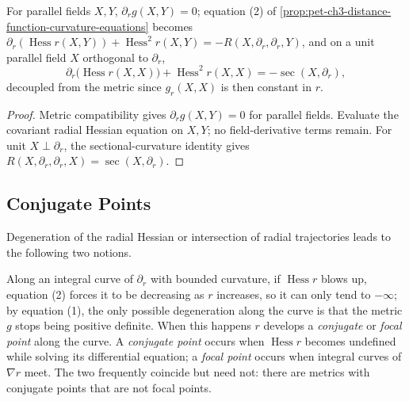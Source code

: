 \begin{proposition}
  \label{prop:pet-ch3-parallel-field-curvature-equation}


  For parallel fields $X,Y$, $\partial_rg(X,Y)=0$; equation (2) of
  \cref{prop:pet-ch3-distance-function-curvature-equations} becomes
  $\partial_r(\operatorname{Hess}r(X,Y))+\operatorname{Hess}^2r(X,Y)=-R(X,\partial_r,\partial_r,Y)$,
  and on a unit parallel field $X$ orthogonal to $\partial_r$,
  \[
    \partial_r\big(\operatorname{Hess}r(X,X)\big)+\operatorname{Hess}^2r(X,X)=-\sec(X,\partial_r),
  \]
  decoupled from the metric since $g_r(X,X)$ is then constant in $r$.
\end{proposition}
\begin{proof}

  \sketch
  Metric compatibility gives $\partial_rg(X,Y)=0$ for parallel fields. Evaluate
  the covariant radial Hessian equation on $X,Y$; no field-derivative terms remain.
  For unit $X\perp\partial_r$, the sectional-curvature identity gives
  $R(X,\partial_r,\partial_r,X)=\sec(X,\partial_r)$.
\end{proof}

\subsection{Conjugate Points}

Degeneration of the radial Hessian or intersection of radial trajectories leads
to the following two notions.

\begin{definition}
  \label{def:pet-ch3-conjugate-focal-point}


  Along an integral curve of $\partial_r$ with bounded curvature, if
  $\operatorname{Hess}r$ blows up, equation (2) forces it to be decreasing as $r$
  increases, so it can only tend to $-\infty$; by equation (1), the only possible
  degeneration along the curve is that the metric $g$ stops being positive
  definite. When this happens $r$ develops a \emph{conjugate} or \emph{focal
  point} along the curve. A \emph{conjugate point} occurs when
  $\operatorname{Hess}r$ becomes undefined while solving its differential
  equation; a \emph{focal point} occurs when integral curves of $\nabla r$ meet.
  The two frequently coincide but need not: there are metrics with conjugate
  points that are not focal points.
\end{definition}

